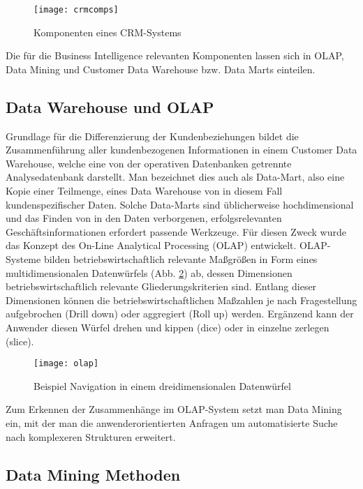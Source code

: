 \begin{figure}[ht]
  \centering
  \texttt{[image: crmcomps]}
  \caption{Komponenten eines CRM-Systems\cite[S. 48]{grundcrm}}
  \label{fig:crmcomps}
\end{figure}

Die für die Business Intelligence relevanten Komponenten lassen sich in OLAP, Data Mining und Customer Data Warehouse bzw. Data Marts einteilen.

\subsection{Data Warehouse und OLAP}

Grundlage für die Differenzierung der Kundenbeziehungen bildet die Zusammenführung aller kundenbezogenen Informationen in einem Customer Data Warehouse, welche eine von der operativen Datenbanken getrennte Analysedatenbank darstellt. \cite[S. 49]{grundcrm}
Man bezeichnet dies auch als Data-Mart, also eine Kopie einer Teilmenge, eines Data Warehouse von in diesem Fall kundenspezifischer Daten. Solche Data-Marts sind üblicherweise hochdimensional und das Finden von in den Daten verborgenen, erfolgsrelevanten Geschäftsinformationen erfordert passende Werkzeuge.
Für diesen Zweck wurde das Konzept des On-Line Analytical Processing (OLAP) entwickelt.
OLAP-Systeme bilden betriebswirtschaftlich relevante Maßgrößen in Form eines multidimensionalen Datenwürfels (Abb. \ref{fig:olap}) ab, dessen Dimensionen betriebswirtschaftlich relevante Gliederungskriterien sind.
Entlang dieser Dimensionen können die betriebswirtschaftlichen Maßzahlen je nach Fragestellung aufgebrochen (Drill down) oder aggregiert (Roll up) werden.
Ergänzend kann der Anwender diesen Würfel drehen und kippen (dice) oder in einzelne  zerlegen (slice).
\cite[S. 49]{grundcrm}

\begin{figure}[ht]
  \centering
  \texttt{[image: olap]}
  \caption{Beispiel Navigation in einem dreidimensionalen Datenwürfel\cite[S. 50]{grundcrm}}
  \label{fig:olap}
\end{figure}

Zum Erkennen der Zusammenhänge im OLAP-System setzt man Data Mining ein, mit der man die anwenderorientierten Anfragen um automatisierte Suche nach komplexeren Strukturen erweitert.

\subsection{Data Mining Methoden}

